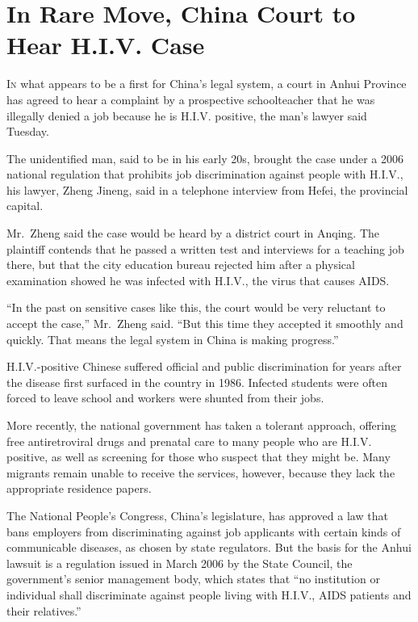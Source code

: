 ﻿\documentclass[12pt]{article}
\begin{document}
\pagebreak
\section{In Rare Move, China Court to Hear H.I.V. Case}

\lettrine{I}{n} what appears to be a first for China's legal system, a
court in Anhui Province has agreed to hear a complaint by a prospective schoolteacher that he was
illegally denied a job because he is H.I.V. positive, the man's lawyer said Tuesday.

The unidentified man, said to be in his early 20s, brought the case under a 2006 national regulation
that prohibits job discrimination against people with H.I.V., his lawyer, Zheng Jineng, said in a
telephone interview from Hefei, the provincial capital.

Mr.~Zheng said the case would be heard by a district court in Anqing. The plaintiff contends that he
passed a written test and interviews for a teaching job there, but that the city education bureau
rejected him after a physical examination showed he was infected with H.I.V., the virus that causes
AIDS.

``In the past on sensitive cases like this, the court would be very reluctant to accept the case,''
Mr.~Zheng said. ``But this time they accepted it smoothly and quickly. That means the legal system
in China is making progress.''

H.I.V.-positive Chinese suffered official and public discrimination for years after the disease
first surfaced in the country in 1986. Infected students were often forced to leave school and
workers were shunted from their jobs.

More recently, the national government has taken a tolerant approach, offering free antiretroviral
drugs and prenatal care to many people who are H.I.V. positive, as well as screening for those who
suspect that they might be. Many migrants remain unable to receive the services, however, because
they lack the appropriate residence papers.

The National People's Congress, China's legislature, has approved a law that bans employers from
discriminating against job applicants with certain kinds of communicable diseases, as chosen by
state regulators. But the basis for the Anhui lawsuit is a regulation issued in March 2006 by the
State Council, the government's senior management body, which states that ``no institution or
individual shall discriminate against people living with H.I.V., AIDS patients and their
relatives.''
\end{document}

